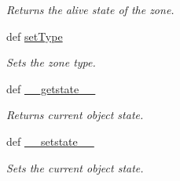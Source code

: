 \begin{DoxyCompactItemize}
\begin{DoxyCompactList}\small\item\em Returns the alive state of the zone. \item\end{DoxyCompactList}\item 
def \hyperlink{class_zone_1_1_zone_ae86cd40bd98448e74ed206e515a1f5da}{setType}
\begin{DoxyCompactList}\small\item\em Sets the zone type. \item\end{DoxyCompactList}\item 
def \hyperlink{class_zone_1_1_zone_a5a7b3f0b78ec9afe8a4bb61f3b7b3dc6}{\_\-\_\-getstate\_\-\_\-}
\begin{DoxyCompactList}\small\item\em Returns current object state. \item\end{DoxyCompactList}\item 
def \hyperlink{class_zone_1_1_zone_a5de944ddd9b301373881c3e867ddae8b}{\_\-\_\-setstate\_\-\_\-}
\begin{DoxyCompactList}\small\item\em Sets the current object state. \item\end{DoxyCompactList}\end{DoxyCompactItemize}
